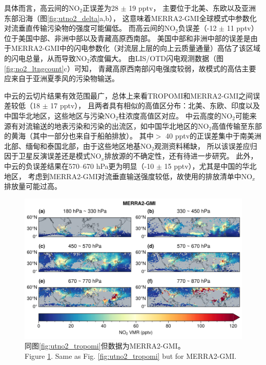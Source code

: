 具体而言，高云间的NO$_2$正误差为28 $\pm$ 19 pptv，
主要位于北美、东欧以及亚洲东部沿海（图\ref{fig:utno2_delta}a,b），
这意味着MERRA2-GMI全球模式中参数化对流垂直传输污染物的强度可能偏低。
而高云间的NO$_2$负误差（-12 $\pm$ 11 pptv）位于美国中部、非洲中部以及青藏高原西南部。
美国中部和非洲中部的误差是由于MERRA2-GMI中的闪电参数化（对流层上层的向上云质量通量）高估了该区域的闪电总量，从而导致NO$_2$浓度偏大\citep{Allen.2002,Allen.2010}。
由LIS/OTD闪电观测数据（图\ref{fig:no2_ltngcount}c）可知，
青藏高原西南部闪电强度较弱，故模式的高估主要应来自于亚洲夏季风的污染物输送。

中云的云切片结果有效范围最广，总体上来看TROPOMI和MERRA2-GMI之间误差较低（18 $\pm$ 17 pptv），
且两者具有相似的高值区分布：北美、东欧、印度以及中国华北地区，这些地区与污染NO$_2$柱浓度高值区对应。
中云高度的NO$_2$可能来源有对流输送的地表污染和污染的出流区，如中国华北地区的NO$_2$高值传输至东部的黄海（其中一部分也来自于船舶排放）。
其中$>$ 40 pptv的正误差集中于南美洲北部、缅甸和泰国北部，由于这些地区地基NO$_2$观测资料稀缺，
所以该误差应归因于卫星反演误差还是模式NO$_x$排放源的不确定性，还有待进一步研究。
此外，中云的负误差结果在570--670 hPa更为明显（-10 $\pm$ 15 pptv），尤其是中国的华北地区，
考虑到MERRA2-GMI对流垂直输送强度较低，故使用的排放清单中NO$_x$排放量可能过高\citep{Ziemke.2019}。

\begin{figure}[H]
    \centering
    \includegraphics[width=13cm]{./figures/utno2_merra2-gmi.png}
    \caption{
    同图\ref{fig:utno2_tropomi}但数据为MERRA2-GMI。 \\
    Figure \ref{fig:utno2_merra2}. Same as Fig. \ref{fig:utno2_tropomi} but for MERRA2-GMI.
    }
    \label{fig:utno2_merra2}
\end{figure}

